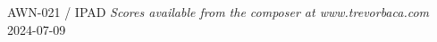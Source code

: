 \documentclass[11pt]{report}
\begin{document}
\null \vfill

AWN-021 / IPAD \hfill
\textit{Scores available from the composer at www.trevorbaca.com}
\hfill 2024-07-09
\end{document}
